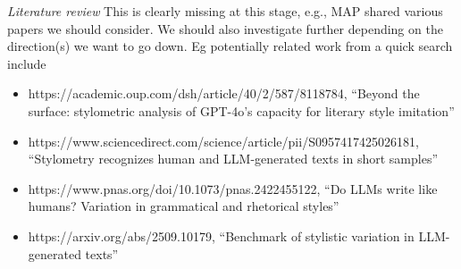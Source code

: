 \documentclass{article}
\begin{document}
\emph{Literature review} This is clearly missing at this stage, e.g., MAP shared various papers we should consider. We should also investigate further depending on the direction(s) we want to go down. Eg potentially related work from a quick search include 
\begin{itemize}
\item https://academic.oup.com/dsh/article/40/2/587/8118784, ``Beyond the surface: stylometric analysis of GPT-4o’s capacity for literary style imitation''
\item https://www.sciencedirect.com/science/article/pii/S0957417425026181, ``Stylometry recognizes human and LLM-generated texts in short samples''
\item https://www.pnas.org/doi/10.1073/pnas.2422455122, ``Do LLMs write like humans? Variation in grammatical and rhetorical styles''
\item https://arxiv.org/abs/2509.10179, ``Benchmark of stylistic variation in LLM-generated texts''
\end{itemize}



\end{document}
